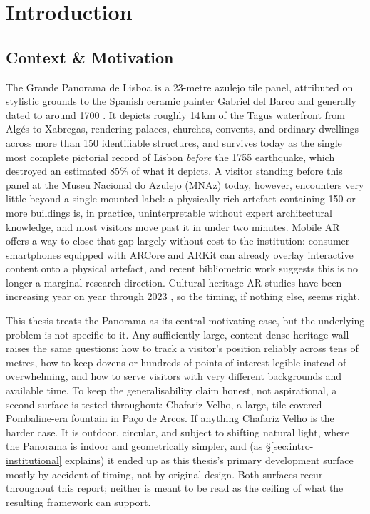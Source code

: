 %

\chapter{Introduction}
\label{cha:introduction}

\section{Context \& Motivation}
\label{sec:intro-context}

The Grande Panorama de Lisboa is a 23-metre azulejo tile panel, attributed
on stylistic grounds to the Spanish ceramic painter Gabriel del Barco and
generally dated to around 1700 \cite{gacpanorama,baroqueartpanorama}. It
depicts roughly 14\,km of the Tagus waterfront from Alg\'{e}s to Xabregas,
rendering palaces, churches, convents, and ordinary dwellings across more
than 150 identifiable structures, and survives today as the single most
complete pictorial record of Lisbon \emph{before} the 1755 earthquake,
which destroyed an estimated 85\% of what it depicts. A visitor standing
before this panel at the Museu Nacional do Azulejo (MNAz) today,
however, encounters very little beyond a single mounted label: a
physically rich artefact containing 150 or more buildings is, in
practice, uninterpretable without expert architectural knowledge, and
most visitors move past it in under two minutes. Mobile AR offers a way
to close that gap largely without cost to the institution: consumer
smartphones equipped with ARCore and ARKit can already overlay
interactive content onto a physical artefact, and recent bibliometric
work suggests this is no longer a marginal research direction. Cultural-heritage AR studies have been increasing year on
year through 2023 \cite{wang2025grand}, so the timing, if nothing else, seems right.

This thesis treats the Panorama as its central motivating case, but the
underlying problem is not specific to it. Any sufficiently large,
content-dense heritage wall raises the same questions: how to track a
visitor's position reliably across tens of metres, how to keep dozens or
hundreds of points of interest legible instead of overwhelming, and how
to serve visitors with very different backgrounds and available time.
To keep the generalisability claim honest, not aspirational,
a second surface is tested throughout: Chafariz Velho, a large,
tile-covered Pombaline-era fountain in Pa\c{c}o de Arcos. If anything
Chafariz Velho is the harder case. It is outdoor, circular, and subject
to shifting natural light, where the Panorama is indoor and
geometrically simpler, and (as \S\ref{sec:intro-institutional} explains)
it ended up as this thesis's primary development surface mostly by
accident of timing, not by original design. Both surfaces recur
throughout this report; neither is meant to be read as the ceiling of
what the resulting framework can support.

